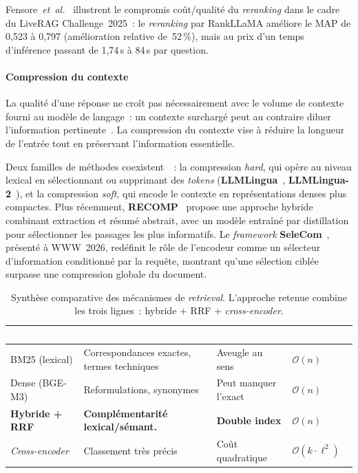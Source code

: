 \documentclass[11pt,a4paper]{article}
\begin{document}
Fensore~\textit{et~al.}~\cite{fensore2025liverag} illustrent le compromis coût/qualité du \textit{reranking} dans le cadre du LiveRAG Challenge~2025~: le \textit{reranking} par RankLLaMA améliore le MAP de 0,523 à 0,797 (amélioration relative de~52\,\%), mais au prix d'un temps d'inférence passant de 1,74\,s à 84\,s par question.

\paragraph{Compression du contexte}

La qualité d'une réponse ne croît pas nécessairement avec le volume de contexte fourni au modèle de langage~: un contexte surchargé peut au contraire diluer l'information pertinente~\cite{gao2024ragsurvey}. La compression du contexte vise à réduire la longueur de l'entrée tout en préservant l'information essentielle.

Deux familles de méthodes coexistent~\cite{pan2024llmlingua2}~: la compression \textit{hard}, qui opère au niveau lexical en sélectionnant ou supprimant des \textit{tokens} (\textbf{LLMLingua}~\cite{jiang2023llmlingua}, \textbf{LLMLingua-2}~\cite{pan2024llmlingua2}), et la compression \textit{soft}, qui encode le contexte en représentations denses plus compactes. Plus récemment, \textbf{RECOMP}~\cite{xu2024recomp} propose une approche hybride combinant extraction et résumé abstrait, avec un modèle entraîné par distillation pour sélectionner les passages les plus informatifs. Le \textit{framework} \textbf{SeleCom}~\cite{selecom2026}, présenté à WWW~2026, redéfinit le rôle de l'encodeur comme un sélecteur d'information conditionné par la requête, montrant qu'une sélection ciblée surpasse une compression globale du document.

\begin{table}[H]
\centering
\small
\begin{tabularx}{\linewidth}{L{3cm} L{3.5cm} L{3.5cm} C{2.5cm}}
\toprule
{}
\textcolor{white}{\textbf{Mécanisme}} &
\textcolor{white}{\textbf{Forces}} &
\textcolor{white}{\textbf{Limites}} &
\textcolor{white}{\textbf{Complexité}} \\
\midrule
BM25 (lexical)        & Correspondances exactes, termes techniques   & Aveugle au sens        & $\mathcal{O}(n)$ \\
Dense (BGE-M3)        & Reformulations, synonymes                     & Peut manquer l'exact   & $\mathcal{O}(n)$ \\
\textbf{Hybride + RRF} & \textbf{Complémentarité lexical/sémant.}      & \textbf{Double index}  & $\mathcal{O}(n)$ \\
\textit{Cross-encoder}& Classement très précis                        & Coût quadratique       & $\mathcal{O}(k \cdot \ell^2)$ \\
\bottomrule
\end{tabularx}
\caption{Synthèse comparative des mécanismes de \textit{retrieval}. L'approche retenue combine les trois lignes~: hybride + RRF + \textit{cross-encoder}.}
\label{tab:retrieval}
\end{table}
\end{document}
